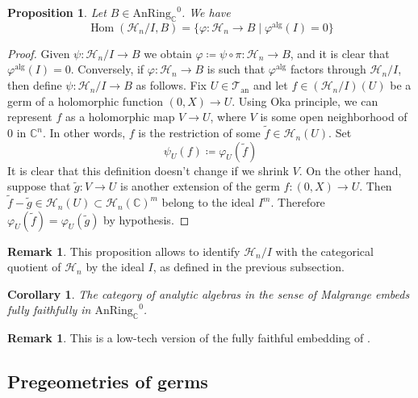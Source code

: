 \documentclass[12pt,a4paper,reqno]{amsart}
\theoremstyle{plain}
\newtheorem{prop}[thm]{Proposition}
\newtheorem{cor}[thm]{Corollary}
\theoremstyle{definition}
\newtheorem{rem}[thm]{Remark}
\theoremstyle{remark}
\numberwithin{equation}{section}
\begin{document}
\begin{prop}
	Let $B \in {\mathrm{AnRing}_{\mathbb C}}^0$.
	We have
	\[ \operatorname{Hom}({\mathcal H}_n / I, B) = \{\varphi \colon {\mathcal H}_n \to B \mid \varphi{^\mathrm{alg}}(I) = 0\} \]
\end{prop}

\begin{proof}
	Given $\psi \colon {\mathcal H}_n / I \to B$ we obtain $\varphi \coloneqq \psi \circ \pi \colon {\mathcal H}_n \to B$, and it is clear that $\varphi{^\mathrm{alg}}(I) = 0$.
	Conversely, if $\varphi \colon {\mathcal H}_n \to B$ is such that $\varphi{^\mathrm{alg}}$ factors through ${\mathcal H}_n / I$, then define $\psi \colon {\mathcal H}_n / I \to B$ as follows.
	Fix $U \in {{\mathcal T}_{\mathrm{an}}}$ and let $f \in ({\mathcal H}_n / I)(U)$ be a germ of a holomorphic function $(0, X) \to U$.
	Using Oka principle, {\ignorespaces} we can represent $f$ as a holomorphic map $V \to U$, where $V$ is some open neighborhood of $0$ in $\mathbb C^n$.
	In other words, $f$ is the restriction of some $\widetilde{f} \in {\mathcal H}_n(U)$.
	Set
	\[ \psi_U(f) \coloneqq \varphi_U(\widetilde{f}) \]
	It is clear that this definition doesn't change if we shrink $V$.
	On the other hand, suppose that $\widetilde{g} \colon V \to U$ is another extension of the germ $f \colon (0, X) \to U$.
	Then $\widetilde{f} - \widetilde{g} \in {\mathcal H}_n(U) \subset {\mathcal H}_n(\mathbb C)^m$ belong to the ideal $I^m$.
	Therefore $\varphi_U(\widetilde{f}) = \varphi_U(\widetilde{g})$ by hypothesis.
\end{proof}

\begin{rem}
	This proposition allows to identify ${\mathcal H}_n / I$ with the categorical quotient of ${\mathcal H}_n$ by the ideal $I$, as defined in the previous subsection.
\end{rem}

\begin{cor} \label{cor:Malgrange_algebras}
	The category of analytic algebras in the sense of Malgrange embeds fully faithfully in ${\mathrm{AnRing}_{\mathbb C}}^0$.
\end{cor}

\begin{rem}
	This is a low-tech version of the fully faithful embedding of \cite[Theorem 12.8]{DAG-IX}.
\end{rem}

\subsection{Pregeometries of germs} \label{sec:pregeometry_germs}
\end{document}
